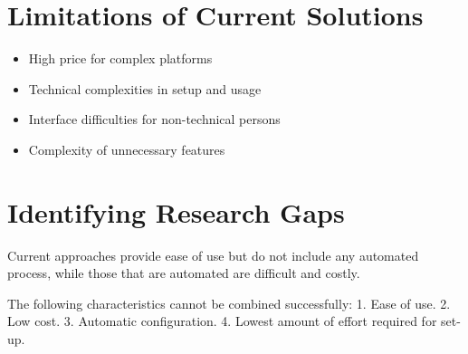 
\section{Limitations of Current Solutions}

\begin{itemize}
    \item High price for complex platforms
    \item Technical complexities in setup and usage
    \item Interface difficulties for non-technical persons
    \item Complexity of unnecessary features
\end{itemize}


\section{Identifying Research Gaps}

Current approaches provide ease of use but do not include any automated process, while those that are automated are difficult and costly.

The following characteristics cannot be combined successfully:
1. Ease of use.
2. Low cost.
3. Automatic configuration.
4. Lowest amount of effort required for set-up. 